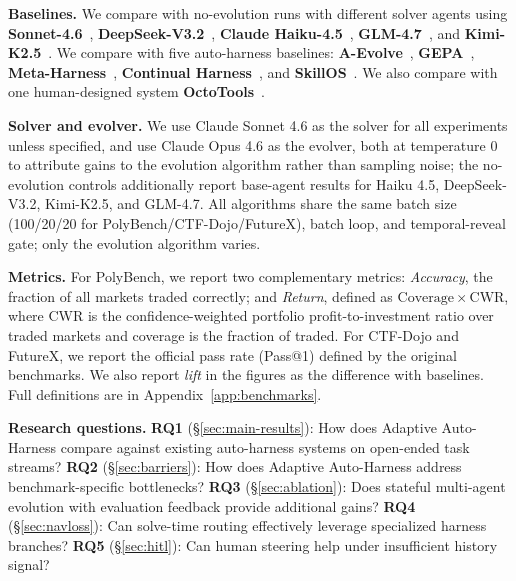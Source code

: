 \noindent\textbf{Baselines.} We compare with no-evolution runs with different solver agents using \textbf{Sonnet-4.6}~\cite{anthropic2025claude46}, \textbf{DeepSeek-V3.2}~\cite{deepseek2024v3}, \textbf{Claude Haiku-4.5}~\cite{anthropic2025haiku45}, \textbf{GLM-4.7}~\cite{glm2024chatglm}, and \textbf{Kimi-K2.5}~\cite{moonshot2025kimik2}. We compare with five auto-harness baselines: \textbf{A-Evolve}~\cite{lin2026position}, \textbf{GEPA}~\cite{agrawal2025gepa}, \textbf{Meta-Harness}~\cite{lee2026meta}, \textbf{Continual Harness}~\cite{karten2026continual}, and \textbf{SkillOS}~\cite{ouyang2026skillos}. We also compare with one human-designed system \textbf{OctoTools}~\cite{lu2025octotools}.


\noindent\textbf{Solver and evolver.} We use Claude Sonnet 4.6 as the solver for all experiments unless specified, and use Claude Opus 4.6 as the evolver, both at temperature 0 to attribute gains to the evolution algorithm rather than sampling noise; the no-evolution controls additionally report base-agent results for Haiku 4.5, DeepSeek-V3.2, Kimi-K2.5, and GLM-4.7. All algorithms share the same batch size (100/20/20 for PolyBench/CTF-Dojo/FutureX), batch loop, and temporal-reveal gate; only the evolution algorithm varies.

\noindent\textbf{Metrics.} For PolyBench, we report two complementary metrics: \emph{Accuracy}, the fraction of all markets traded correctly; and \emph{Return}, defined as $\mathrm{Coverage}\times\mathrm{CWR}$, where CWR is the confidence-weighted portfolio profit-to-investment ratio over traded markets and coverage is the fraction of traded. For CTF-Dojo and FutureX, we report the official pass rate (Pass@1) defined by the original benchmarks. We also report \emph{lift} in the figures as the difference with baselines. Full definitions are in Appendix~\ref{app:benchmarks}.



\noindent\textbf{Research questions.}
\textbf{RQ1} (\S\ref{sec:main-results}): How does Adaptive Auto-Harness compare against existing auto-harness systems on open-ended task streams?
\textbf{RQ2} (\S\ref{sec:barriers}): How does Adaptive Auto-Harness address benchmark-specific bottlenecks?
\textbf{RQ3} (\S\ref{sec:ablation}): Does stateful multi-agent evolution with evaluation feedback provide additional gains?
\textbf{RQ4} (\S\ref{sec:navloss}): Can solve-time routing effectively leverage specialized harness branches?
\textbf{RQ5} (\S\ref{sec:hitl}): Can human steering help under insufficient history signal?

